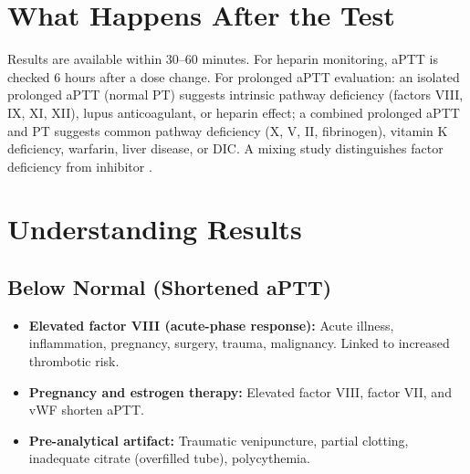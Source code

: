 \section*{What Happens After the Test}
Results are available within 30--60 minutes. For heparin monitoring, aPTT is checked 6 hours after a dose change. For prolonged aPTT evaluation: an isolated prolonged aPTT (normal PT) suggests intrinsic pathway deficiency (factors VIII, IX, XI, XII), lupus anticoagulant, or heparin effect; a combined prolonged aPTT and PT suggests common pathway deficiency (X, V, II, fibrinogen), vitamin K deficiency, warfarin, liver disease, or DIC. A mixing study distinguishes factor deficiency from inhibitor \cite{wallach2022interpretation}.

\section*{Understanding Results}

\subsection*{Below Normal (Shortened aPTT)}
\begin{itemize}
  \item \textbf{Elevated factor VIII (acute-phase response):} Acute illness, inflammation, pregnancy, surgery, trauma, malignancy. Linked to increased thrombotic risk.
  \item \textbf{Pregnancy and estrogen therapy:} Elevated factor VIII, factor VII, and vWF shorten aPTT.
  \item \textbf{Pre-analytical artifact:} Traumatic venipuncture, partial clotting, inadequate citrate (overfilled tube), polycythemia.
\end{itemize}

